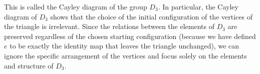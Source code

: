 \begin{example}
\begin{center}
    \end{center}
    This is called the Cayley diagram of the group \(D_3\). In particular, the
    Cayley diagram of \(D_3\) shows that the choice of the initial configuration
    of the vertices of the triangle is irrelevant. Since the relations between
    the elements of \(D_3\) are preserved regardless of the chosen starting
    configuration (because we have defined \(e\) to be exactly the identity map
    that leaves the triangle unchanged), we can ignore the specific arrangement
    of the vertices and focus solely on the elements and structure of \(D_3\).


\end{example}
